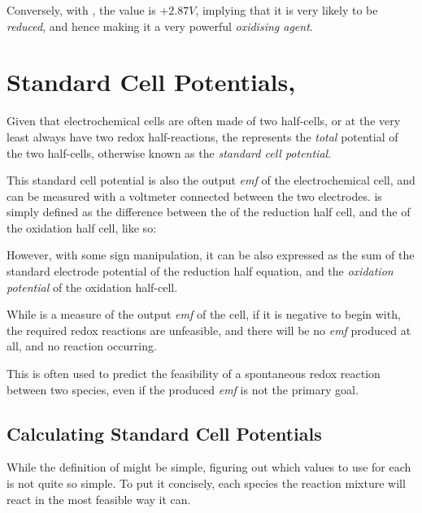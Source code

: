 			Conversely, with , the \Eo{} value is $+2.87V$, implying that it is very likely to be \textit{reduced}, and hence
			making it a very powerful \textit{oxidising agent}.





	\pagebreak
	\section{Standard Cell Potentials, \MEcell{}}

		Given that electrochemical cells are often made of two half-cells, or at the very least always have two redox half-reactions,
		the \Ecell{} represents the \textit{total} potential of the two half-cells, otherwise known as the \textit{standard cell potential}.

		This standard cell potential is also the output \textit{emf} of the electrochemical cell, and can be measured with a voltmeter
		connected between the two electrodes. \Ecell{} is simply defined as the difference between the \Eo{} of the reduction half cell, and
		the \Eo{} of the oxidation half cell, like so:


		However, with some sign manipulation, it can be also expressed as the sum of the standard electrode potential of the reduction
		half equation, and the \textit{oxidation potential} of the oxidation half-cell.


		While \Ecell{} is a measure of the output \textit{emf} of the cell, if it is negative to begin with, the required redox
		reactions are unfeasible, and there will be no \textit{emf} produced at all, and no reaction occurring.

		This is often used to predict the feasibility of a spontaneous redox reaction between two species, even if the produced
		\textit{emf} is not the primary goal.


		\subsection{Calculating Standard Cell Potentials}

			While the definition of \Ecell{} might be simple, figuring out which values to use for each \Eo{} is not quite so simple. To put it
			concisely, each species the reaction mixture will react in the most feasible way it can.

